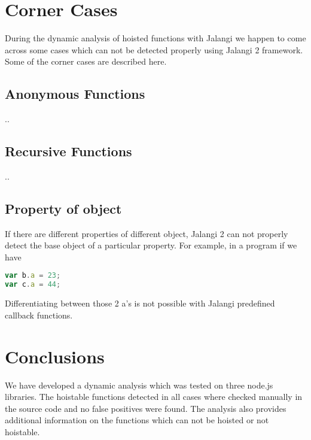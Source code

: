 \documentclass[accentcolor=tud0b,12pt,paper=a4]{tudreport}
\begin{document}
\chapter{Corner Cases}
During the dynamic analysis of hoisted functions with Jalangi we happen to come across some cases which can not be detected properly using Jalangi 2 framework. Some of the corner cases are described here.
\section{Anonymous Functions}
..
\section{Recursive Functions}
..
\section{Property of object}
If there are different properties of different object, Jalangi 2 can not properly detect the base object of a particular property. For example, in a program if we have
\begin{lstlisting}[language=JavaScript]
var b.a = 23;
var c.a = 44;
\end{lstlisting}
Differentiating between those 2 a's is not possible with Jalangi predefined callback functions.

\chapter{Conclusions}
We have developed a dynamic analysis which was tested on three node.js libraries. The hoistable functions detected in all cases where checked manually in the source code and no false positives were found. The analysis also provides additional information on the functions which can not be hoisted or not hoistable. 
\end{document}
